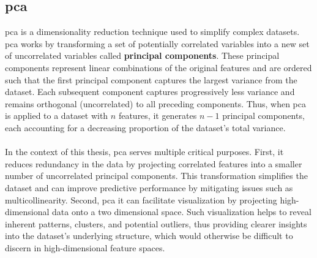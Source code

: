 \documentclass[12pt,a4paper]{report}
\begin{document}
\subsection{\acrfull{pca}}
\acrfull{pca} is a dimensionality reduction technique used to simplify complex datasets. \acrshort{pca} works by transforming a set of potentially correlated variables into a new set of uncorrelated variables called \textbf{principal components}. These principal components represent linear combinations of the original features and are ordered such that the first principal component captures the largest variance from the dataset. Each subsequent component captures progressively less variance and remains orthogonal (uncorrelated) to all preceding components. Thus, when \acrshort{pca} is applied to a dataset with $n$ features, it generates $n-1$ principal components, each accounting for a decreasing proportion of the dataset's total variance.\\
\\
In the context of this thesis, \acrshort{pca} serves multiple critical purposes. First, it reduces redundancy in the data by projecting correlated features into a smaller number of uncorrelated principal components. This transformation simplifies the dataset and can improve predictive performance by mitigating issues such as multicollinearity. Second, \acrshort{pca} it can facilitate visualization by projecting high-dimensional data onto a two dimensional space. Such visualization helps to reveal inherent patterns, clusters, and potential outliers, thus providing clearer insights into the dataset’s underlying structure, which would otherwise be difficult to discern in high-dimensional feature spaces.
\end{document}
